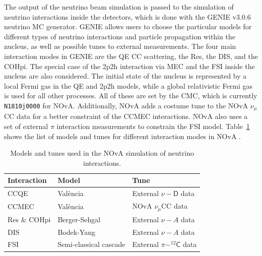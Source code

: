 The output of the neutrino beam simulation is passed to the simulation of neutrino interactions inside the detectors, which is done with the GENIE v3.0.6~\cite{GENIE.pdf} neutrino \gls{MC} generator. GENIE allows users to choose the particular models for different types of neutrino interactions and particle propagation within the nucleus, as well as possible tunes to external measurements. The four main interaction modes in GENIE are the \gls{QE} \gls{CC} scattering, the \gls{Res}, the \gls{DIS}, and the \gls{COHpi}. The special case of the \gls{2p2h} interaction via \gls{MEC} and the \gls{FSI} inside the nucleus are also considered. The initial state of the nucleus is represented by a local Fermi gas in the \gls{QE} and {2p2h} models, while a global relativistic Fermi gas is used for all other processes. All of these are set by the \gls{CMC}, which is currently \texttt{N1810j0000} for \gls{NOvA}. Additionally, \gls{NOvA} adds a costume tune to the \gls{NOvA} $\nu_\mu$\gls{CC} data for a better constraint of the \gls{CC}\gls{MEC} interactions. \gls{NOvA} also uses a set of external $\pi$ interaction measurements to constrain the \gls{FSI} model. Table~\ref{tab:NuIntSimulationModels} shows the list of models and tunes for different interaction modes in \gls{NOvA} \cite{NOvAResults2021.pdf}.

\begin{table}[!ht]
\centering
\caption{Models and tunes used in the NOvA simulation of neutrino interactions.}
\begin{tabular}{|l|l|l|}
\hline
Interaction & Model                  & Tune\\\hline
\gls{CC}\gls{QE} & Val\`{e}ncia \cite{ValenciaModel_NOvACCQE_2004.pdf} & External $\nu-\textsf{D}$ data \cite{NuDeuteriumScattering_NOvACCQETune_2016.pdf}\\
\gls{CC}\gls{MEC} & Val\`{e}ncia \cite{ValenciaModel_NOvACCQEMEC_2011.pdf,ValenciaModel_NOvAMEC_2013.pdf} & \gls{NOvA} $\nu_\mu$\gls{CC} data\\
\gls{Res} \& \gls{COHpi} & Berger-Sehgal \cite{BergerSehgal_ResonancePionProd_2007.pdf,BergerSehgalModel_CohPionProd_2009.pdf}          & External $\nu-A$ data\\
\gls{DIS} & Bodek-Yang \cite{BodekYangModel_NOvADIS_2003.pdf,HadronizationModelForNuDIS_NOvADIS_1988.pdf}            & External $\nu-A$ data\\
\gls{FSI} & Semi-classical cascade \cite{FSIModel_hNSemiClassicalCascade_1988.pdf} & External $\pi-^{12}\textsf{C}$ data\\\hline
\end{tabular}
\label{tab:NuIntSimulationModels}
\end{table}

